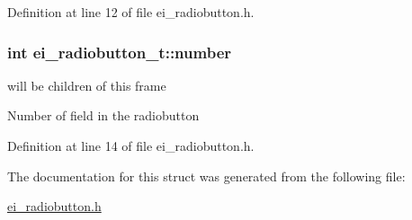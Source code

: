 Definition at line 12 of file ei\+\_\+radiobutton.\+h.

\hypertarget{structei__radiobutton__t_a0b39fd134b987b3bfc1a850c4169886d}{
\subsubsection[{number}]{\setlength{\rightskip}{0pt plus 5cm}int ei\+\_\+radiobutton\+\_\+t\+::number}}\label{structei__radiobutton__t_a0b39fd134b987b3bfc1a850c4169886d}


will be children of this frame 

Number of field in the radiobutton 

Definition at line 14 of file ei\+\_\+radiobutton.\+h.



The documentation for this struct was generated from the following file\+:\begin{DoxyCompactItemize}
\item 
\hyperlink{ei__radiobutton_8h}{ei\+\_\+radiobutton.\+h}\end{DoxyCompactItemize}
